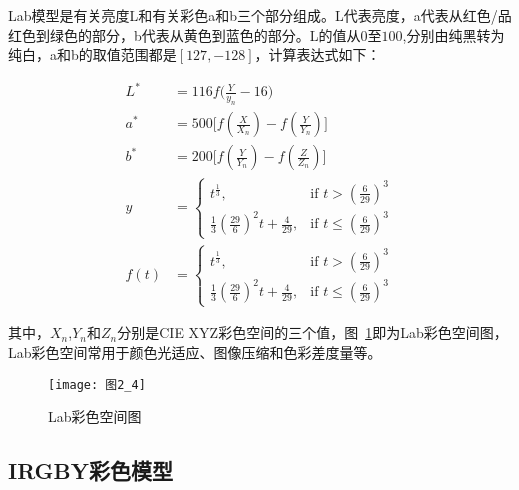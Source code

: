 Lab模型是有关亮度L和有关彩色a和b三个部分组成。L代表亮度，a代表从红色/品红色到绿色的部分，b代表从黄色到蓝色的部分。L的值从$0$至$100$,分别由纯黑转为纯白，a和b的取值范围都是$[127,-128]$，计算表达式如下：
\begin{linenomath}
\begin{align}
L^{*} &= 116f\big(\frac{Y}{y_{n}}-16\big)\label{式2_1}\\
a^{*} &= 500\big[f(\frac{X}{X_{n}})-f(\frac{Y}{Y_{n}})\big]\label{式2_2}\\
b^{*} &= 200\big[f(\frac{Y}{Y_{n}})-f(\frac{Z}{Z_{n}})\big]\label{式2_3}\\
y &= \left\{ \begin{array}{ll}
t^{\frac{1}{3}}, & \textrm{if $t>(\frac{6}{29})^{3}$}\\
\frac{1}{3}(\frac{29}{6})^{2}t+\frac{4}{29}, & \textrm{if $t\leq (\frac{6}{29})^{3}$}
\end{array} \right.\label{式2_4}\\
f(t) &= \left\{ \begin{array}{ll}
t^{\frac{1}{3}}, & \textrm{if $t>(\frac{6}{29})^{3}$}\\
\frac{1}{3}(\frac{29}{6})^{2}t+\frac{4}{29}, & \textrm{if $t\leq (\frac{6}{29})^{3}$}
\end{array} \right.\label{式2_5}
\end{align}
\end{linenomath}
其中，$X_{n}$,$Y_{n}$和$Z_{n}$分别是CIE XYZ彩色空间的三个值，图~\ref{图2_4}即为Lab彩色空间图，Lab彩色空间常用于颜色光适应、图像压缩和色彩差度量等。
\begin{figure}[h]
  \centering
  \texttt{[image: 图2\_4]}
  \caption{Lab彩色空间图}
  \label{图2_4}    
\end{figure}

\subsection{IRGBY彩色模型}
\label{2_1_3}

